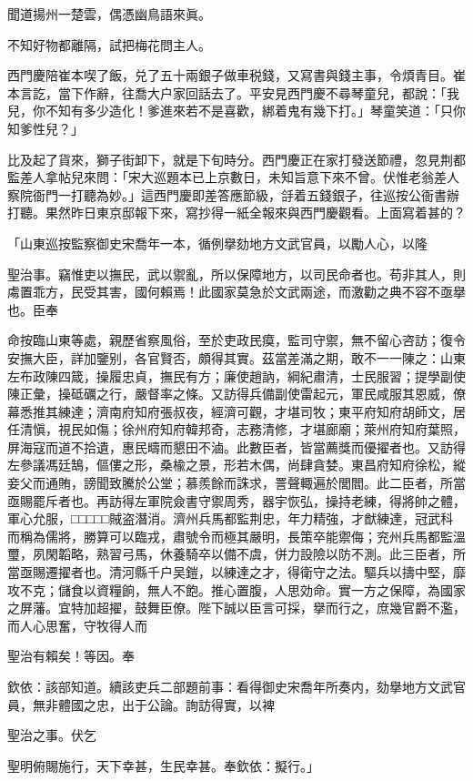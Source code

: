 \begin{myquote}
聞道揚州一楚雲，偶憑幽鳥語來眞。

不知好物都離隔，試把梅花問主人。
\end{myquote}

西門慶陪崔本喫了飯，兑了五十兩銀子做車税錢，又寫書與錢主事，令煩青目。崔本言訖，當下作辭，往喬大户家回話去了。平安見西門慶不尋琴童兒，都說：「我兒，你不知有多少造化！爹進來若不是喜歡，綁着鬼有幾下打。」琴童笑道：「只你知爹性兒？」

比及起了貨來，獅子街卸下，就是下旬時分。西門慶正在家打發送節禮，忽見荆都監差人拿帖兒來問：「宋大巡題本已上京數日，未知旨意下來不曾。伏惟老翁差人察院衙門一打聽為妙。」這西門慶即差答應節級，㧱着五錢銀子，往巡按公衙書辦打聽。果然昨日東京邸報下來，寫抄得一紙全報來與西門慶觀看。上面寫着甚的？

\begin{myquote}[\markfont]
「山東巡按監察御史宋喬年一本，循例擧劾地方文武官員，以勵人心，以隆

聖治事。竊惟吏以撫民，武以禦亂，所以保障地方，以司民命者也。苟非其人，則䖏置乖方，民受其害，國何賴焉！此國家莫急於文武兩途，而激勸之典不容不亟擧也。臣奉

命按臨山東等處，親歷省察風俗，至於吏政民瘼，監司守禦，無不留心咨訪；復令安撫大臣，詳加鑒别，各官賢否，頗得其實。茲當差滿之期，敢不一一陳之：山東左布政陳四箴，操履忠貞，撫民有方；廉使趙訥，綱紀肅清，士民服習；提學副使陳正彙，操砥礪之行，嚴督率之條。又訪得兵備副使雷起元，軍民咸服其恩威，僚幕悉推其練達；濟南府知府張叔夜，經濟可觀，才堪司牧；東平府知府胡師文，居任清愼，視民如傷；徐州府知府韓邦奇，志務清修，才堪廊廟；萊州府知府葉照，屏海寇而道不拾遺，惠民疇而懇田不滷。此數臣者，皆當薦獎而優擢者也。又訪得左參議馮廷鵠，傴僂之形，桑楡之景，形若木偶，尚肆貪婪。東昌府知府徐松，縱妾父而通賄，謗聞致騰於公堂；慕羨餘而誅求，詈聲輙遍於閭閻。此二臣者，所當亟賜罷斥者也。再訪得左軍院僉書守禦周秀，器宇恢弘，操持老練，得將帥之體，軍心允服，□□□□□賊盗潛消。濟州兵馬都監荆忠，年力精強，才猷練達，冠武科而稱為儒將，勝算可以臨戎，肅號令而極其嚴明，長策卒能禦侮；兖州兵馬都監溫璽，夙閑韜略，熟習弓馬，休養騎卒以備不虞，併力設險以防不測。此三臣者，所當亟賜遷擢者也。清河縣千户吴鎧，以練達之才，得衛守之法。驅兵以擣中堅，靡攻不克；儲食以資糧餉，無人不飽。推心置腹，人思効命。實一方之保障，為國家之屏藩。宜特加超擢，鼓舞臣僚。陛下誠以臣言可採，擧而行之，庶幾官爵不濫，而人心思奮，守牧得人而

聖治有賴矣！等因。奉

欽依：該部知道。續該吏兵二部題前事：看得御史宋喬年所奏内，劾擧地方文武官員，無非體國之忠，出于公論。詢訪得實，以裨

聖治之事。伏乞

聖明俯賜施行，天下幸甚，生民幸甚。奉欽依：擬行。」
\end{myquote}

